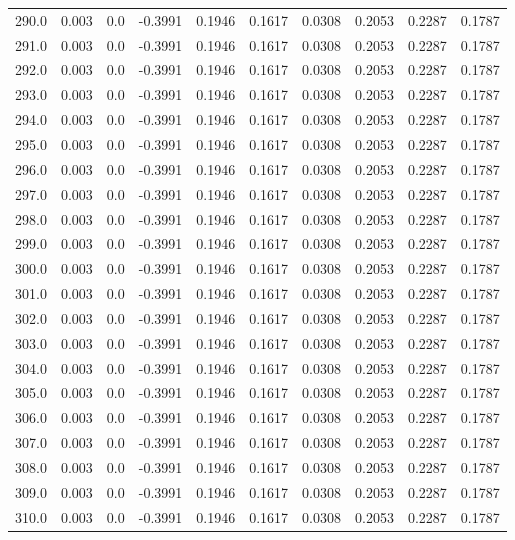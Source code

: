 \begin{longtable}{lrrrrrrrrr}
290.0 & 0.003 & 0.0 & -0.3991 & 0.1946 & 0.1617 & 0.0308 & 0.2053 & 0.2287 & 0.1787 \\
291.0 & 0.003 & 0.0 & -0.3991 & 0.1946 & 0.1617 & 0.0308 & 0.2053 & 0.2287 & 0.1787 \\
292.0 & 0.003 & 0.0 & -0.3991 & 0.1946 & 0.1617 & 0.0308 & 0.2053 & 0.2287 & 0.1787 \\
293.0 & 0.003 & 0.0 & -0.3991 & 0.1946 & 0.1617 & 0.0308 & 0.2053 & 0.2287 & 0.1787 \\
294.0 & 0.003 & 0.0 & -0.3991 & 0.1946 & 0.1617 & 0.0308 & 0.2053 & 0.2287 & 0.1787 \\
295.0 & 0.003 & 0.0 & -0.3991 & 0.1946 & 0.1617 & 0.0308 & 0.2053 & 0.2287 & 0.1787 \\
296.0 & 0.003 & 0.0 & -0.3991 & 0.1946 & 0.1617 & 0.0308 & 0.2053 & 0.2287 & 0.1787 \\
297.0 & 0.003 & 0.0 & -0.3991 & 0.1946 & 0.1617 & 0.0308 & 0.2053 & 0.2287 & 0.1787 \\
298.0 & 0.003 & 0.0 & -0.3991 & 0.1946 & 0.1617 & 0.0308 & 0.2053 & 0.2287 & 0.1787 \\
299.0 & 0.003 & 0.0 & -0.3991 & 0.1946 & 0.1617 & 0.0308 & 0.2053 & 0.2287 & 0.1787 \\
300.0 & 0.003 & 0.0 & -0.3991 & 0.1946 & 0.1617 & 0.0308 & 0.2053 & 0.2287 & 0.1787 \\
301.0 & 0.003 & 0.0 & -0.3991 & 0.1946 & 0.1617 & 0.0308 & 0.2053 & 0.2287 & 0.1787 \\
302.0 & 0.003 & 0.0 & -0.3991 & 0.1946 & 0.1617 & 0.0308 & 0.2053 & 0.2287 & 0.1787 \\
303.0 & 0.003 & 0.0 & -0.3991 & 0.1946 & 0.1617 & 0.0308 & 0.2053 & 0.2287 & 0.1787 \\
304.0 & 0.003 & 0.0 & -0.3991 & 0.1946 & 0.1617 & 0.0308 & 0.2053 & 0.2287 & 0.1787 \\
305.0 & 0.003 & 0.0 & -0.3991 & 0.1946 & 0.1617 & 0.0308 & 0.2053 & 0.2287 & 0.1787 \\
306.0 & 0.003 & 0.0 & -0.3991 & 0.1946 & 0.1617 & 0.0308 & 0.2053 & 0.2287 & 0.1787 \\
307.0 & 0.003 & 0.0 & -0.3991 & 0.1946 & 0.1617 & 0.0308 & 0.2053 & 0.2287 & 0.1787 \\
308.0 & 0.003 & 0.0 & -0.3991 & 0.1946 & 0.1617 & 0.0308 & 0.2053 & 0.2287 & 0.1787 \\
309.0 & 0.003 & 0.0 & -0.3991 & 0.1946 & 0.1617 & 0.0308 & 0.2053 & 0.2287 & 0.1787 \\
310.0 & 0.003 & 0.0 & -0.3991 & 0.1946 & 0.1617 & 0.0308 & 0.2053 & 0.2287 & 0.1787 \\

\end{longtable}

